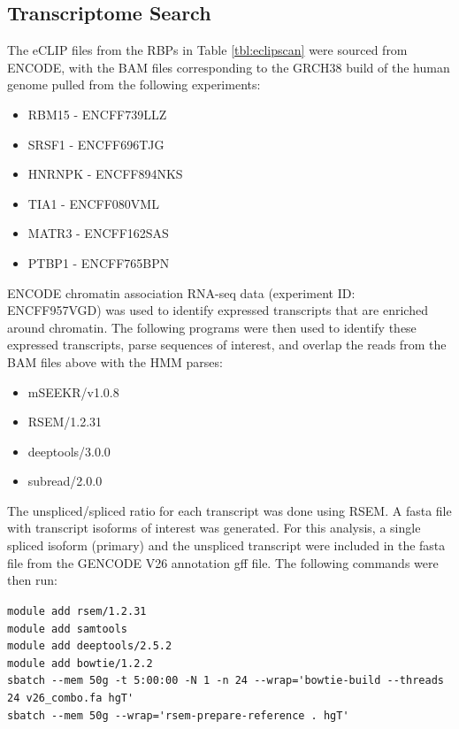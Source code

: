\subsection{Transcriptome Search}
The eCLIP files from the RBPs in Table \ref{tbl:eclipscan} were sourced from ENCODE, with the BAM files corresponding to the GRCH38 build of the human genome pulled from the following experiments: 

\begin{itemize}
  \item RBM15 - ENCFF739LLZ
  \item SRSF1 - ENCFF696TJG
  \item HNRNPK - ENCFF894NKS
  \item TIA1 - ENCFF080VML
  \item MATR3 - ENCFF162SAS
  \item PTBP1 - ENCFF765BPN
\end{itemize}

ENCODE chromatin association RNA-seq data (experiment ID: ENCFF957VGD) was used to identify expressed transcripts that are enriched around chromatin. The following programs were then used to identify these expressed transcripts, parse sequences of interest, and overlap the reads from the BAM files above with the HMM parses: 

\begin{itemize}
   \item mSEEKR/v1.0.8
    \item RSEM/1.2.31
    \item deeptools/3.0.0
    \item  subread/2.0.0
\end{itemize}

The unspliced/spliced ratio for each transcript was done using RSEM. A fasta file with transcript isoforms of interest was generated. For this analysis, a single spliced isoform (primary) and the unspliced transcript were included in the fasta file from the GENCODE V26 annotation gff file. The following commands were then run: 

\lstinline{module add rsem/1.2.31}\\
\lstinline{module add samtools}\\
\lstinline{module add deeptools/2.5.2}\\
\lstinline{module add bowtie/1.2.2}\\
\lstinline{sbatch --mem 50g -t 5:00:00 -N 1 -n 24 --wrap='bowtie-build --threads 24 v26_combo.fa hgT'}\\
\lstinline{sbatch --mem 50g --wrap='rsem-prepare-reference . hgT'}\\    


